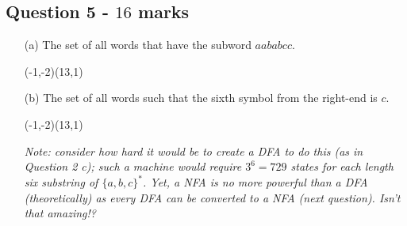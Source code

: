 \documentclass[12pt]{article}
\begin{document}
\subsection*{Question 5 - $16$ marks}
\begin{enumerate}
\item[(a)] The set of all words that have the subword $aababcc$.
\begin{center}
\begin{VCPicture}{(-1,-2)(13,1)}
\SmallState
{}

%
\end{VCPicture}
\end{center}

\item[(b)] The set of all words such that the sixth symbol from the right-end is $c$.

\begin{center}
\begin{VCPicture}{(-1,-2)(13,1)}
\SmallState
{}

%
\end{VCPicture}
\end{center}
\vspace{2mm}
\small\emph{Note: consider how hard it would be to create a DFA to do this (as in Question 2 c); such a machine would require $3^6 = 729$ states for each length six substring of $\{a,b,c\}^*$. Yet, a NFA is no more powerful than a DFA (theoretically) as every DFA can be converted to a NFA (next question). Isn't that amazing!? }

\end{enumerate}
\end{document}
